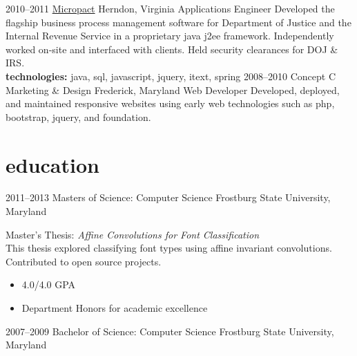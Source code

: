 \documentclass[]{friggeri-cv} %
\begin{document}
\begin{entrylist}
{}
\entry
{2010--2011}
{\href{https://www.micropact.com/}{Micropact}}
{Herndon, Virginia}
{Applications Engineer}
{
Developed the flagship business process management software for Department of Justice and the Internal Revenue Service in a proprietary java j2ee framework. Independently worked on-site and interfaced with clients. Held security clearances for DOJ \& IRS.\\
\textbf{technologies:} java, sql, javascript, jquery, itext, spring
}
\entry
{2008--2010}
{Concept C Marketing \& Design}
{Frederick, Maryland}
{Web Developer}
{
	Developed, deployed, and maintained responsive websites using early web technologies such as php, bootstrap, jquery, and foundation.
}

\end{entrylist}

\section{education}

\begin{entrylist}
\entryFour
{2011--2013}
{Masters {\normalfont of Science: Computer Science}}
{Frostburg State University, Maryland}
{
Master's Thesis: \emph{Affine Convolutions for Font Classification} \\ This thesis explored classifying font types using affine invariant convolutions. \\
Contributed to open source projects.
	\begin{itemize}
	\item 4.0/4.0 GPA
	\item Department Honors for academic excellence 
	\end{itemize}
}
\entryFour
{2007--2009}
{Bachelor {\normalfont of Science: Computer Science}}
{Frostburg State University, Maryland}
{}

\end{entrylist}
\end{document}
